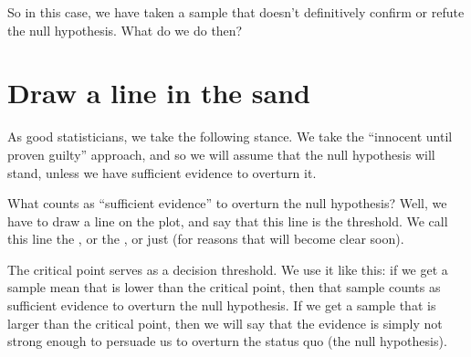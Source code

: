 \documentclass[../../../main.tex]{subfiles}
\begin{document}
\begin{center}
\end{center}

\noindent
So in this case, we have taken a sample that doesn't definitively confirm or refute the null hypothesis. What do we do then?


\section{Draw a line in the sand}

As good statisticians, we take the following stance. We take the ``innocent until proven guilty'' approach, and so we will assume that the null hypothesis will stand, unless we have sufficient evidence to overturn it. 

What counts as ``sufficient evidence'' to overturn the null hypothesis? Well, we have to draw a line on the plot, and say that this line is the threshold. We call this line the , or the , or just  (for reasons that will become clear soon).

The critical point serves as a decision threshold. We use it like this: if we get a sample mean that is lower than the critical point, then that sample counts as sufficient evidence to overturn the null hypothesis. If we get a sample that is larger than the critical point, then we will say that the evidence is simply not strong enough to persuade us to overturn the status quo (the null hypothesis).
\end{document}
